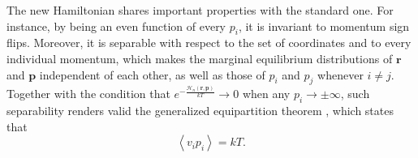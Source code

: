 \documentclass[
aip,
jcp,
reprint,
]{revtex4-1}
\newcommand{\vt}[1]{\boldsymbol{\mathbf{#1}}}          %
\newcommand{\nn}{n}
\begin{document}
The new Hamiltonian shares important properties with the standard one.
For instance, by being an even function of every $p_i$, it is invariant to momentum sign flips.
Moreover, it is separable with respect to the set of coordinates and to every individual momentum, which makes the marginal equilibrium distributions of $\vt r$ and $\vt p$ independent of each other, as well as those of $p_i$ and $p_j$ whenever $i \neq j$.
Together with the condition that $e^{-\frac{\mathcal{H}_\nn(\vt r, \vt p)}{k T}} \to 0$ when any $p_i \to \pm \infty$, such separability renders valid  \cite{Uline_2008} the generalized equipartition theorem \cite{Tolman_1918a}, which states that
\begin{equation}
\label{eq:generalized equipartition}
\left\langle v_i p_i \right\rangle = k T.
\end{equation}
\end{document}
